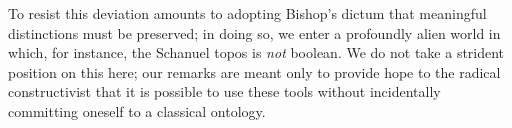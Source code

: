\documentclass{article}
\begin{document}
To resist this deviation amounts to adopting Bishop's dictum that
meaningful distinctions must be preserved; in doing so, we enter a
profoundly alien world in which, for instance, the Schanuel topos is
\emph{not} boolean. We do not take a strident position on this here;
our remarks are meant only to provide hope to the radical
constructivist that it is possible to use these tools without
incidentally committing oneself to a classical ontology.


\newpage



\end{document}
